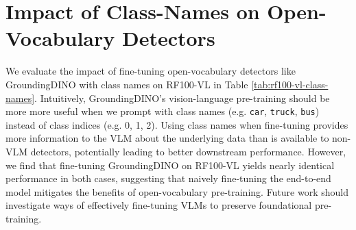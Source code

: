 {
\setlength{\tabcolsep}{3.4em}
\begin{table}[h]
\caption{\textbf{FLOPs Benchmarking Comparison.} We compare FLOPs reported with custom benchmarking tools, CalFLOPs, and PyTorch's FlopCounterMode. Notably, we find that FlopCounterModel closely matches the results reported with custom benchmarking code, suggesting that it is more reliable than prior generic benchmarking tools.}
\label{tab:flops}
\end{table}
}

\section{Impact of Class-Names on Open-Vocabulary Detectors}
We evaluate the impact of fine-tuning open-vocabulary detectors like GroundingDINO with class names on RF100-VL in Table \ref{tab:rf100-vl-class-names}. Intuitively, GroundingDINO's vision-language pre-training should be more more useful when we prompt with class names (e.g. {\tt car}, {\tt truck}, {\tt bus}) instead of class indices (e.g. 0, 1, 2). Using class names when fine-tuning provides more information to the VLM about the underlying data than is available to non-VLM detectors, potentially leading to better downstream performance. However, we find that fine-tuning GroundingDINO on RF100-VL yields nearly identical performance in both cases, suggesting that naively fine-tuning the end-to-end model mitigates the benefits of open-vocabulary pre-training. Future work should investigate ways of effectively fine-tuning VLMs to preserve foundational pre-training.

